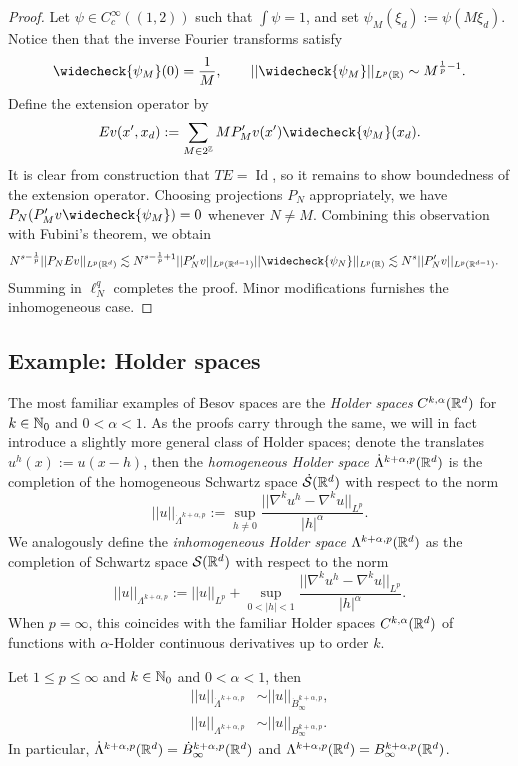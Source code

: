 \begin{proof}
	Let $\psi \in C^\infty_c ((1, 2))$ such that $\int \psi = 1$, and set $\psi_M (\xi_d) := \psi (M \xi_d)$. Notice then that the inverse Fourier transforms satisfy
		\[ \widecheck{\psi_M} (0) = \frac1M, \qquad || \widecheck{\psi_M} ||_{L^p (\R)} \sim M^{\frac1p - 1}. \]
	Define the extension operator by 	
		\[ Ev (x', x_d) := \sum_{M \in 2^\Z} M P'_M v(x') \widecheck{\psi_M} (x_d) . \]
	It is clear from construction that $TE = \operatorname{Id}$, so it remains to show boundedness of the extension operator. Choosing projections $P_N$ appropriately, we have $P_N (P'_M v \widecheck{\psi_M}) = 0$ whenever $N \neq M$. Combining this observation with Fubini's theorem, we obtain 
		\begin{align*}
			N^{s - \frac1p} ||P_N Ev||_{L^p (\R^{d})} 
			 	&\lesssim N^{s - \frac1p + 1} ||  P'_N v ||_{L^p (\R^{d - 1})} ||\widecheck{\psi_N}||_{L^p (\R)} \lesssim  N^{s} ||P'_N v ||_{L^p (\R^{d - 1})}.
		\end{align*}	 
	Summing in $\ell^q_N$ completes the proof. Minor modifications furnishes the inhomogeneous case. 	
\end{proof}

\subsection{Example: Holder spaces}

The most familiar examples of Besov spaces are the \emph{Holder spaces} $C^{k, \alpha} (\mathbb R^d)$ for $k \in \mathbb N_0$ and $0 < \alpha < 1$. As the proofs carry through the same, we will in fact introduce a slightly more general class of Holder spaces; denote the translates $u^h (x) := u(x - h)$, then the \emph{homogeneous Holder space} $\dot \Lambda^{k + \alpha, p} (\mathbb R^d)$ is the completion of the homogeneous Schwartz space $\dot {\mathcal S} (\mathbb R^d)$ with respect to the norm
	\[
		||u||_{\dot \Lambda^{k + \alpha, p}} := \sup_{h \neq 0} \frac{||\nabla^k u^h - \nabla^k u||_{L^p}}{|h|^\alpha}.
	\]
We analogously define the \emph{inhomogeneous Holder space} $\Lambda^{k + \alpha, p} (\mathbb R^d)$ as the completion of Schwartz space $\mathcal S (\mathbb R^d)$ with respect to the norm 
	\[ ||u||_{\Lambda^{k + \alpha, p}} := ||u||_{L^p} +  \sup_{0 < |h| < 1} \frac{||\nabla^k u^h - \nabla^k u||_{L^p}}{|h|^\alpha} .\]
When $p = \infty$, this coincides with the familiar Holder spaces $C^{k, \alpha} (\mathbb R^d)$ of functions with $\alpha$-Holder continuous derivatives up to order $k$. 
	
\begin{proposition}
	Let $1 \leq p \leq \infty$ and $k \in \mathbb N_0$ and $0 < \alpha < 1$, then 
		\begin{align*}
			||u||_{\dot \Lambda^{k + \alpha, p}} 
				&\sim ||u||_{\dot B^{k + \alpha, p}_\infty}, \\
			||u||_{\Lambda^{k + \alpha, p}} 
				&\sim ||u||_{B^{k + \alpha, p}_\infty}.	
		\end{align*}	
	In particular, $\dot \Lambda^{k + \alpha, p} (\mathbb R^d) = \dot B^{k + \alpha, p}_\infty (\mathbb R^d)$ and $\Lambda^{k + \alpha, p} (\mathbb R^d) = B^{k + \alpha, p}_\infty (\mathbb R^d)$. 
\end{proposition}

